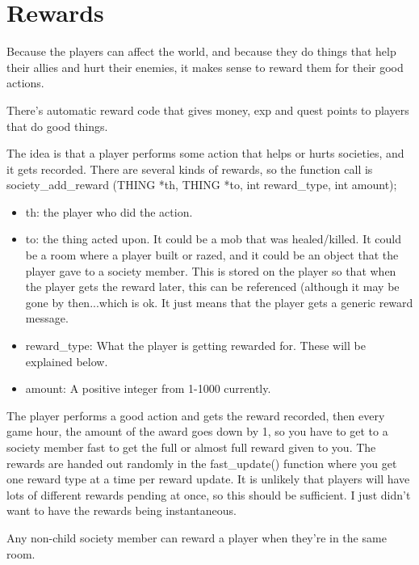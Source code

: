 \chapter{Rewards}

Because the players can affect the world, and because they do things that help
their allies and hurt their enemies, it makes sense to reward them for their
good actions.

There's automatic reward code that gives money, exp and quest points to
players that do good things.

The idea is that a player performs some action that helps or hurts societies,
and it gets recorded. There are several kinds of rewards, so the function call
is society\_add\_reward (THING *th, THING *to, int reward\_type, int amount);

\begin{itemize}

\item th: the player who did the action.

\item to: the thing acted upon. It could be a mob that was healed/killed. It
  could be a room where a player built or razed, and it could be an object
  that the player gave to a society member. This is stored on the player so
  that when the player gets the reward later, this can be referenced (although
  it may be gone by then...which is ok. It just means that the player gets a
  generic reward message.

\item reward\_type: What the player is getting rewarded for. These will be
  explained below.

\item amount: A positive integer from 1-1000 currently. 

\end{itemize}

The player performs a good action and gets the reward recorded, then every
game hour, the amount of the award goes down by 1, so you have to get to a
society member fast to get the full or almost full reward given to you. The
rewards are handed out randomly in the fast\_update() function where you get
one reward type at a time per reward update. It is unlikely that players will
have lots of different rewards pending at once, so this should be
sufficient. I just didn't want to have the rewards being instantaneous.

Any non-child society member can reward a player when they're in the same room.

